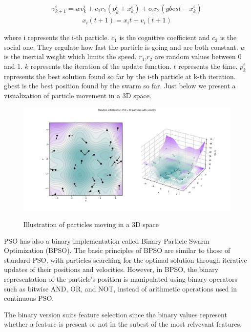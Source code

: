 \documentclass{Configuration_Files/PoliMi3i_thesis}
\begin{document}
\begin{align}
	v_{k+1}^i=w v_k^i+c_1 r_1\left(p_k^i+x_k^i\right)+c_2 r_2\left(g b e s t-x_k^i\right)
	\label{eq:bpso1}
\end{align}
\begin{align}
	x_i(t+1)=x_i t+v_i(t+1)
	\label{eq:bpso2}
\end{align}

where i represents the i-th particle. $c_1$ is the cognitive coefficient and $c_2$ is the social one. They regulate how fast the particle is going and are both constant. $w$ is the inertial weight which limits the speed. $r_1$,$r_2$ are random values between 0 and 1. $k$ represents the iteration of the update function. $t$ represents the time. $p^{i}_{k}$ represents the best solution found so far by the i-th particle at k-th iteration. gbest is the best position found by the swarm so far.
Just below we present a visualization of particle movement in a 3D space. 

\begin{figure}[H]
	\includegraphics[scale=0.35]{pso.png}
    \label{pso}
	\caption{Illustration of particles moving in a 3D space}
\end{figure}

PSO has also a binary implementation called Binary Particle Swarm Optimization (BPSO).
The basic principles of BPSO are similar to those of standard PSO, with particles searching for the optimal solution through iterative updates of their positions and velocities. However, in BPSO, the binary representation of the particle's position is manipulated using binary operators such as bitwise AND, OR, and NOT, instead of arithmetic operations used in continuous PSO. \cite{kennedyDiscreteBinaryVersion1997}

The binary version suits feature selection since the binary values represent whether a feature is present or not in the subest of the most relvevant features.
\end{document}
